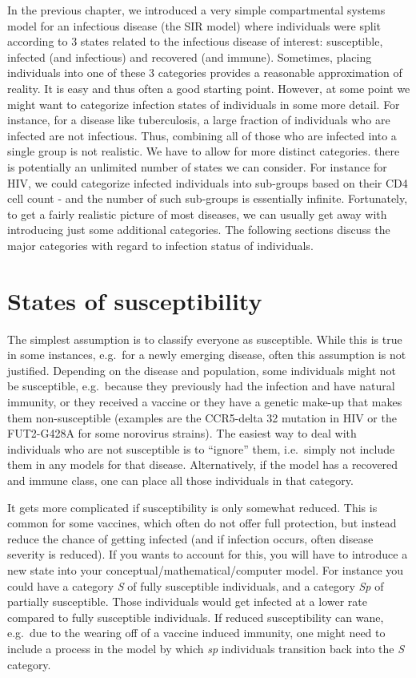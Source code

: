 \documentclass[
]{book}
\begin{document}
In the previous chapter, we introduced a very simple compartmental systems model for an infectious disease (the SIR model) where individuals were split according to 3 states related to the infectious disease of interest: susceptible, infected (and infectious) and recovered (and immune). Sometimes, placing individuals into one of these 3 categories provides a reasonable approximation of reality. It is easy and thus often a good starting point. However, at some point we might want to categorize infection states of individuals in some more detail. For instance, for a disease like tuberculosis, a large fraction of individuals who are infected are not infectious. Thus, combining all of those who are infected into a single group is not realistic. We have to allow for more distinct categories. there is potentially an unlimited number of states we can consider. For instance for HIV, we could categorize infected individuals into sub-groups based on their CD4 cell count - and the number of such sub-groups is essentially infinite. Fortunately, to get a fairly realistic picture of most diseases, we can usually get away with introducing just some additional categories. The following sections discuss the major categories with regard to infection status of individuals.

\hypertarget{states-of-susceptibility}{%
\section{States of susceptibility}\label{states-of-susceptibility}}

The simplest assumption is to classify everyone as susceptible. While this is true in some instances, e.g.~for a newly emerging disease, often this assumption is not justified. Depending on the disease and population, some individuals might not be susceptible, e.g.~because they previously had the infection and have natural immunity, or they received a vaccine or they have a genetic make-up that makes them non-susceptible (examples are the CCR5-delta 32 mutation in HIV or the FUT2-G428A for some norovirus strains). The easiest way to deal with individuals who are not susceptible is to ``ignore'' them, i.e.~simply not include them in any models for that disease. Alternatively, if the model has a recovered and immune class, one can place all those individuals in that category.

It gets more complicated if susceptibility is only somewhat reduced. This is common for some vaccines, which often do not offer full protection, but instead reduce the chance of getting infected (and if infection occurs, often disease severity is reduced). If you wants to account for this, you will have to introduce a new state into your conceptual/mathematical/computer model. For instance you could have a category \emph{S} of fully susceptible individuals, and a category \emph{Sp} of partially susceptible. Those individuals would get infected at a lower rate compared to fully susceptible individuals. If reduced susceptibility can wane, e.g.~due to the wearing off of a vaccine induced immunity, one might need to include a process in the model by which \emph{sp} individuals transition back into the \emph{S} category.
\end{document}
